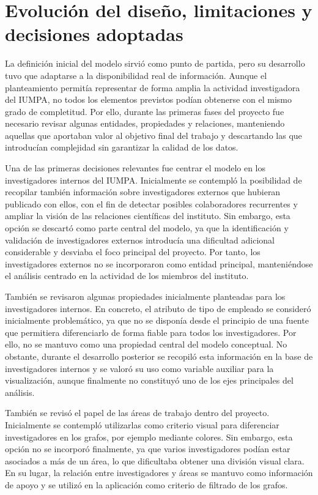 \documentclass[11pt,spanish,listoffigures,listoftables]{tfgetsinf}
\begin{document}
\section{Evolución del diseño, limitaciones y decisiones adoptadas}

La definición inicial del modelo sirvió como punto de partida, pero su desarrollo tuvo que adaptarse a la disponibilidad real de información. Aunque el planteamiento permitía representar de forma amplia la actividad investigadora del IUMPA, no todos los elementos previstos podían obtenerse con el mismo grado de completitud. Por ello, durante las primeras fases del proyecto fue necesario revisar algunas entidades, propiedades y relaciones, manteniendo aquellas que aportaban valor al objetivo final del trabajo y descartando las que introducían complejidad sin garantizar la calidad de los datos.

Una de las primeras decisiones relevantes fue centrar el modelo en los investigadores internos del IUMPA. Inicialmente se contempló la posibilidad de recopilar también información sobre investigadores externos que hubieran publicado con ellos, con el fin de detectar posibles colaboradores recurrentes y ampliar la visión de las relaciones científicas del instituto. Sin embargo, esta opción se descartó como parte central del modelo, ya que la identificación y validación de investigadores externos introducía una dificultad adicional considerable y desviaba el foco principal del proyecto. Por tanto, los investigadores externos no se incorporaron como entidad principal, manteniéndose el análisis centrado en la actividad de los miembros del instituto.

También se revisaron algunas propiedades inicialmente planteadas para los investigadores internos. En concreto, el atributo de tipo de empleado se consideró inicialmente problemático, ya que no se disponía desde el principio de una fuente que permitiera diferenciarlo de forma fiable para todos los investigadores. Por ello, no se mantuvo como una propiedad central del modelo conceptual. No obstante, durante el desarrollo posterior se recopiló esta información en la base de investigadores internos y se valoró su uso como variable auxiliar para la visualización, aunque finalmente no constituyó uno de los ejes principales del análisis.

También se revisó el papel de las áreas de trabajo dentro del proyecto. Inicialmente se contempló utilizarlas como criterio visual para diferenciar investigadores en los grafos, por ejemplo mediante colores. Sin embargo, esta opción no se incorporó finalmente, ya que varios investigadores podían estar asociados a más de un área, lo que dificultaba obtener una división visual clara. En su lugar, la relación entre investigadores y áreas se mantuvo como información de apoyo y se utilizó en la aplicación como criterio de filtrado de los grafos.
\end{document}
